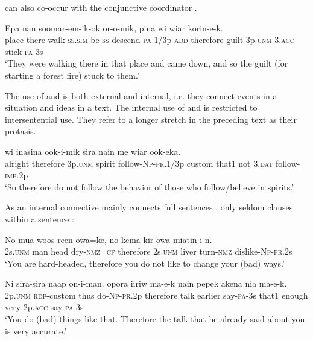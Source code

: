  can also co-occur with the conjunctive coordinator . 

\ea%
\label{ex:8:x1403}
\gll Epa  nan  soomar-em-ik-ok  or-o-mik,     pina  wi  wiar  korin-e-k.  \\
place  there  walk-\textsc{ss}.\textsc{sim}-be-\textsc{ss} descend-\textsc{pa}-1/3p \textsc{add}  therefore  guilt  3p.\textsc{unm} 3.\textsc{acc} stick-\textsc{pa}-3s\\
\glt`They were walking there in that place and came down, and so the guilt (for starting a forest fire) stuck to them.'
\z


The use of  and  is both external and internal, i.e. they connect events in a situation and ideas in a text. The internal use of  and  is restricted to intersentential use. They refer to a longer stretch in the preceding text as their protasis.

\ea%
\label{ex:8:x1407}
\gll {}    wi  inasina  ook-i-mik sira  nain  me  wiar  ook-eka.  \\
alright  therefore  3p.\textsc{unm} spirit  follow-\textsc{Np}-\textsc{pr}.1/3p custom  that1  not  3.\textsc{dat} follow-\textsc{imp}.2p\\
\glt`So therefore do not follow the behavior of those who follow/believe in spirits.'
\z

 
As an internal connective  mainly connects full sentences , only seldom clauses within a sentence :

\ea%
\label{ex:8:x1410}
\gll No  mua  woos  reen-owa=ke,    no  kema  kir-owa miatin-i-n.\\
2s.\textsc{unm} man  head  dry-\textsc{nmz}=\textsc{cf} therefore  2s.\textsc{unm} liver turn-\textsc{nmz} dislike-\textsc{Np}-\textsc{pr}.2s\\
\glt`You are hard-headed, therefore you do not like to change your (bad) ways.'
\z


\ea%
\label{ex:8:x1411}
\gll Ni  sira-sira  naap  on-i-man.    opora  iiriw ma-e-k  nain  pepek  akena  nia  ma-e-k.\\
2p.\textsc{unm} \textsc{rdp}-custom  thus  do-\textsc{Np}-\textsc{pr}.2p  therefore  talk  earlier say-\textsc{pa}-3s  that1  enough  very  2p.\textsc{acc} say-\textsc{pa}-3s\\
\glt`You do (bad) things like that. Therefore the talk that he already said about you is very accurate.'
\z


